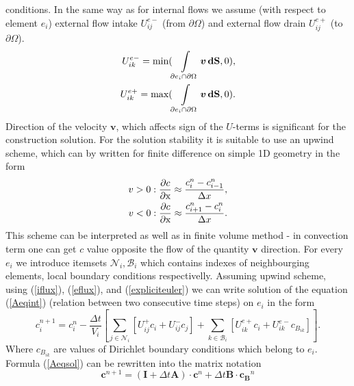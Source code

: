  conditions. In the same way as for internal flows we assume
  (with respect to element $e_i$) external flow intake $U_{ij}^{e-}$ (from $\partial\Omega$) and external flow drain $U_{ij}^{e+}$ (to $\partial\Omega$).
    \begin{eqnarray}     
      U_{ik}^{e-} = \text{min}(\int\limits_{\partial e_i \cap \partial \Omega } \boldsymbol{v} \, \mathbf{dS},0), \notag \\
      U_{ik}^{e+} = \text{max}(\int\limits_{\partial e_i \cap \partial \Omega } \boldsymbol{v} \, \mathbf{dS},0). \label{eflux}  
    \end{eqnarray}
    Direction of the velocity $\boldsymbol{v}$, which affects sign of the $U$-terms is significant for the construction solution. For the solution
    stability it is suitable to use an upwind scheme, which can by written for finite difference on simple 1D geometry in the form
    \begin{eqnarray} 
      v>0 : \frac{\partial c}{\partial \textrm{x}} \approx \frac{c_{i}^n - c_{i-1}^n}{\Delta x},   \notag \\
      v<0 : \frac{\partial c}{\partial \textrm{x}} \approx \frac{c_{i+1}^n - c_i^n}{\Delta x}.   \label{upwind} 
    \end{eqnarray}
    This scheme can be interpreted as well as in finite volume method - in convection term one can get $c$ value opposite the flow of the quantity $\boldsymbol{v}$ direction.
      For every $e_i$ we introduce itemsets $\mathcal{N}_{i}, \mathcal{B}_{i}$ which contains indexes of neighbourging elements, local boundary conditions respectivelly.  
     Assuming upwind scheme, using (\ref{iflux}), (\ref{eflux}), and  (\ref{expliciteuler}) we can write solution of the equation (\ref{Aeqint}) 
    (relation between two consecutive time steps) on $e_i$ in the form 
    \begin{equation}
      c_i^{n+1} = c_i^n - \frac{\Delta t}{V_{i}} \left[ \sum_{j \in \mathcal{N}_{i}} \left[ U_{ij}^{+} c_i +  U_{ij}^{-} c_{j} \right] +
      \sum_{k \in \mathcal{B}_{i}}  \left[  U_{ik}^{e+} c_i +  U_{ik}^{e-} c_{B_{ik}} \right] \right]. \label{Aeqsol}
    \end{equation}
    Where $c_{B_{ik}}$ are values of Dirichlet boundary conditions which belong to $e_i$. Formula (\ref{Aeqsol}) can be rewritten into the matrix notation
    \begin{equation}
     \mathbf{c}^{n+1} = (\mathbf{I} + \Delta t \mathbf{A}) \cdot \mathbf{c}^{n} + \Delta t \mathbf{B} \cdot \mathbf{c_{B}}^{n} \label{AeqsolM}
    \end{equation}
